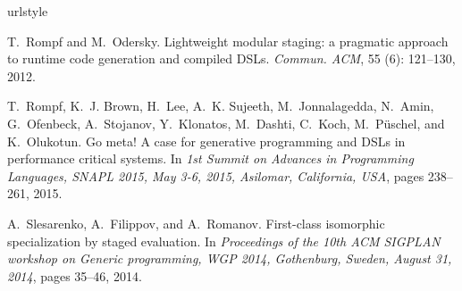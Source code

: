 \documentclass[preprint]{sigplanconf}
\begin{document}
%
%
%
%





%

\begin{thebibliography}{3}
\softraggedright
\providecommand{\natexlab}[1]{#1}
\providecommand{\url}[1]{\texttt{#1}}
\expandafter\ifx\csname urlstyle\endcsname\relax
  \providecommand{\doi}[1]{doi: #1}\else
  \providecommand{\doi}{doi: \begingroup \urlstyle{rm}\Url}\fi

T.~Rompf and M.~Odersky.
\newblock Lightweight modular staging: a pragmatic approach to runtime code
  generation and compiled {DSLs}.
\newblock \emph{Commun. {ACM}}, 55 (6): 121--130, 2012.

T.~Rompf, K.~J. Brown, H.~Lee, A.~K. Sujeeth, M.~Jonnalagedda, N.~Amin,
  G.~Ofenbeck, A.~Stojanov, Y.~Klonatos, M.~Dashti, C.~Koch, M.~P{\"{u}}schel,
  and K.~Olukotun.
\newblock Go meta! {A} case for generative programming and {DSLs} in
  performance critical systems.
\newblock In \emph{1st Summit on Advances in Programming Languages, {SNAPL}
  2015, May 3-6, 2015, Asilomar, California, {USA}}, pages 238--261, 2015.

A.~Slesarenko, A.~Filippov, and A.~Romanov.
\newblock First-class isomorphic specialization by staged evaluation.
\newblock In \emph{Proceedings of the 10th {ACM} {SIGPLAN} workshop on Generic
  programming, {WGP} 2014, Gothenburg, Sweden, August 31, 2014}, pages 35--46,
  2014.

\end{thebibliography}
\end{document}
